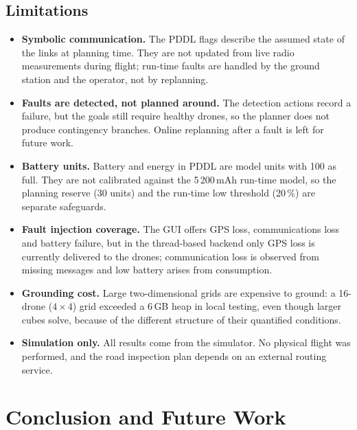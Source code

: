 \documentclass[11pt,a4paper,oneside]{report}
\begin{document}
\section{Limitations}
\begin{itemize}
  \item \textbf{Symbolic communication.} The PDDL flags describe the assumed state of the links at
        planning time. They are not updated from live radio measurements during flight; run-time
        faults are handled by the ground station and the operator, not by replanning.
  \item \textbf{Faults are detected, not planned around.} The detection actions record a failure,
        but the goals still require healthy drones, so the planner does not produce contingency
        branches. Online replanning after a fault is left for future work.
  \item \textbf{Battery units.} Battery and energy in PDDL are model units with 100 as full. They
        are not calibrated against the 5\,200\,mAh run-time model, so the planning reserve (30
        units) and the run-time low threshold (20\,\%) are separate safeguards.
  \item \textbf{Fault injection coverage.} The GUI offers GPS loss, communications loss and battery
        failure, but in the thread-based backend only GPS loss is currently delivered to the
        drones; communication loss is observed from missing messages and low battery arises from
        consumption.
  \item \textbf{Grounding cost.} Large two-dimensional grids are expensive to ground: a 16-drone
        ($4\times4$) grid exceeded a 6\,GB heap in local testing, even though larger cubes solve,
        because of the different structure of their quantified conditions.
  \item \textbf{Simulation only.} All results come from the simulator. No physical flight was
        performed, and the road inspection plan depends on an external routing service.
\end{itemize}

\chapter{Conclusion and Future Work}\label{ch:conclusion}
\end{document}
